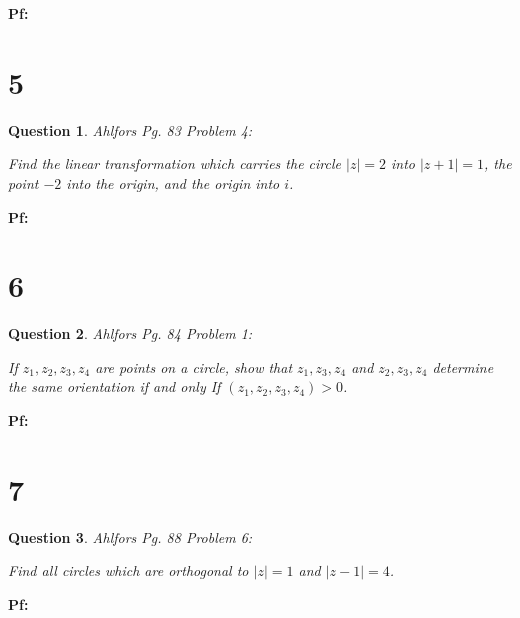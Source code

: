 \documentclass{article}
\newtheorem{question}{Question}
\begin{document}
\textbf{Pf:}

\break

\section*{5}
\begin{myBox}[]{}
    \begin{question}
        Ahlfors Pg. 83 Problem 4:

        Find the linear transformation which carries the circle $|z|=2$ into $|z+1|=1$,
        the point $-2$ into the origin, and the origin into $i$.
    \end{question}
\end{myBox}

\textbf{Pf:}

\break

\section*{6}
\begin{myBox}[]{}
    \begin{question}
        Ahlfors Pg. 84 Problem 1:

        If $z_1,z_2,z_3,z_4$ are points on a circle, show that $z_1,z_3,z_4$ and $z_2,z_3,z_4$ determine the same orientation if and only If
        $(z_1,z_2,z_3,z_4)>0$.
    \end{question}
\end{myBox}

\textbf{Pf:}

\break

\section*{7}
\begin{myBox}[]{}
    \begin{question}
       Ahlfors Pg. 88 Problem 6:

       Find all circles which are orthogonal to $|z|=1$ and $|z-1|=4$.
    \end{question}
\end{myBox}

\textbf{Pf:}
\end{document}
